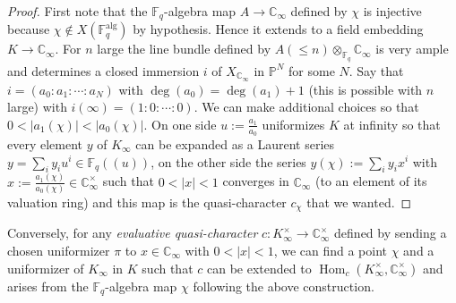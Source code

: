 \documentclass[11pt]{amsart}
\numberwithin{equation}{section}
\newcommand{\FF}{\mathbb{F}}
\newcommand{\CC}{\mathbb{C}}
\newcommand{\PP}{\mathbb{P}}
\begin{document}
\begin{proof}
First note that the $\FF_q$-algebra map $A\rightarrow\CC_\infty$ defined by $\chi$ is injective because $\chi\not\in X(\FF_q^{\text{alg}})$ by hypothesis. Hence it extends to a field embedding $K\rightarrow\CC_\infty$.
For $n$ large the line bundle defined by $A(\leq n)\otimes_{\FF_q}\CC_\infty$ is very ample and determines 
a closed immersion $i$ of $X_{\CC_\infty}$ in $\PP^N$ for some $N$. Say that $i=(a_0:a_1:\cdots:a_N)$ with $\deg(a_0)=\deg(a_1)+1$ (this is possible with $n$ large) with $i(\infty)=(1:0:\cdots:0)$. We can make 
additional choices so that $0<|a_1(\chi)|<|a_0(\chi)|$. On one side $u:=\frac{a_1}{a_0}$ uniformizes $K$ at infinity
so that every element $y$ of $K_\infty$ can be expanded as a Laurent series $y=\sum_iy_iu^i\in\FF_q((u))$, on the other side
the series $y(\chi):=\sum_iy_ix^i$ with $x:=\frac{a_1(\chi)}{a_0(\chi)}\in\CC_\infty^\times$ such that $0<|x|<1$
converges in $\CC_\infty$ (to an element of its valuation ring) and this map is the quasi-character $c_\chi$ that we wanted.
\end{proof}

Conversely, for any {\em evaluative quasi-character} $c:K_\infty^\times\rightarrow\CC_\infty^\times$ defined by sending a chosen uniformizer $\pi$ to $x\in\CC_\infty$ with $0<|x|<1$, we can find a point $\chi$ and 
a uniformizer of $K_\infty$ in $K$ such that $c$ can be extended to $\operatorname{Hom}_c(K_\infty^\times,\CC_\infty^\times)$ and arises from the $\FF_q$-algebra map $\chi$ following the above construction. 
\end{document}

